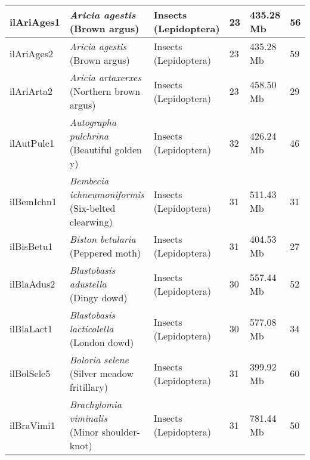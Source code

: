 \begin{centering}
\begin{longtable}{l|l|l|l|l|l}
ilAriAges1 & \makecell[{l}]{\textit{Aricia agestis} \\ (Brown argus)} & \makecell[{l}]{Insects \\ (Lepidoptera)} & 23 & 435.28 Mb & 56  \\ \hline
ilAriAges2 & \makecell[{l}]{\textit{Aricia agestis} \\ (Brown argus)} & \makecell[{l}]{Insects \\ (Lepidoptera)} & 23 & 435.28 Mb & 59  \\ \hline
ilAriArta2 & \makecell[{l}]{\textit{Aricia artaxerxes} \\ (Northern brown argus)} & \makecell[{l}]{Insects \\ (Lepidoptera)} & 23 & 458.50 Mb & 29  \\ \hline
ilAutPulc1 & \makecell[{l}]{\textit{Autographa pulchrina} \\ (Beautiful golden y)} & \makecell[{l}]{Insects \\ (Lepidoptera)} & 32 & 426.24 Mb & 46  \\ \hline
ilBemIchn1 & \makecell[{l}]{\textit{Bembecia ichneumoniformis} \\ (Six-belted clearwing)} & \makecell[{l}]{Insects \\ (Lepidoptera)} & 31 & 511.43 Mb & 31  \\ \hline
ilBisBetu1 & \makecell[{l}]{\textit{Biston betularia} \\ (Peppered moth)} & \makecell[{l}]{Insects \\ (Lepidoptera)} & 31 & 404.53 Mb & 27  \\ \hline
ilBlaAdus2 & \makecell[{l}]{\textit{Blastobasis adustella} \\ (Dingy dowd)} & \makecell[{l}]{Insects \\ (Lepidoptera)} & 30 & 557.44 Mb & 52  \\ \hline
ilBlaLact1 & \makecell[{l}]{\textit{Blastobasis lacticolella} \\ (London dowd)} & \makecell[{l}]{Insects \\ (Lepidoptera)} & 30 & 577.08 Mb & 34  \\ \hline
ilBolSele5 & \makecell[{l}]{\textit{Boloria selene} \\ (Silver meadow fritillary)} & \makecell[{l}]{Insects \\ (Lepidoptera)} & 31 & 399.92 Mb & 60  \\ \hline
ilBraVimi1 & \makecell[{l}]{\textit{Brachylomia viminalis} \\ (Minor shoulder-knot)} & \makecell[{l}]{Insects \\ (Lepidoptera)} & 31 & 781.44 Mb & 50  \\ \hline

\end{longtable}
\end{centering}
